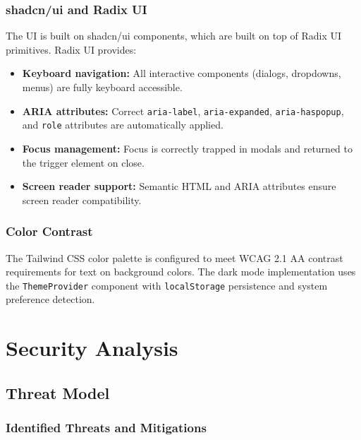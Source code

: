 \documentclass[12pt,onecolumn]{IEEEtran}
\let\oldsection\section
\renewcommand{\section}{\clearpage\oldsection}
\begin{document}
\subsubsection{shadcn/ui and Radix UI}

The UI is built on shadcn/ui components, which are built on top of Radix UI primitives. Radix UI provides:
\begin{itemize}[leftmargin=1.5em]
  \item \textbf{Keyboard navigation:} All interactive components (dialogs, dropdowns, menus) are fully keyboard accessible.
  \item \textbf{ARIA attributes:} Correct \texttt{aria-label}, \texttt{aria-expanded}, \texttt{aria-haspopup}, and \texttt{role} attributes are automatically applied.
  \item \textbf{Focus management:} Focus is correctly trapped in modals and returned to the trigger element on close.
  \item \textbf{Screen reader support:} Semantic HTML and ARIA attributes ensure screen reader compatibility.
\end{itemize}

\subsubsection{Color Contrast}

The Tailwind CSS color palette is configured to meet WCAG 2.1 AA contrast requirements for text on background colors. The dark mode implementation uses the \texttt{ThemeProvider} component with \texttt{localStorage} persistence and system preference detection.



\section{Security Analysis}


\subsection{Threat Model}

\subsubsection{Identified Threats and Mitigations}
\end{document}

